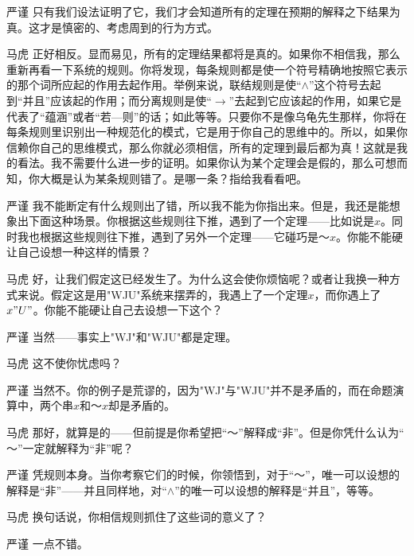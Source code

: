 \begin{dialogue}[labelwidth=2\ccwd, leftmargin=3\ccwd, topsep=\medskipamount]
\item[严谨]只有我们设法证明了它，我们才会知道所有的定理在预期的解释之下结果为真。这才是慎密的、考虑周到的行为方式。

\item[马虎]正好相反。显而易见，所有的定理结果都将是真的。如果你不相信我，那么重新再看一下系统的规则。你将发现，每条规则都是使一个符号精确地按照它表示的那个词所应起的作用去起作用。举例来说，联结规则是使“$∧$”这个符号去起到“并且”应该起的作用；而分离规则是使“$→$”去起到它应该起的作用，如果它是代表了“蕴涵”或者“若—则”的话；如此等等。只要你不是像乌龟先生那样，你将在每条规则里识别出一种规范化的模式，它是用于你自己的思维中的。所以，如果你信赖你自己的思维模式，那么你就必须相信，所有的定理到最后都为真！这就是我的看法。我不需要什么进一步的证明。如果你认为某个定理会是假的，那么可想而知，你大概是认为某条规则错了。是哪一条？指给我看看吧。

\item[严谨]我不能断定有什么规则出了错，所以我不能为你指出来。但是，我还是能想象出下面这种场景。你根据这些规则往下推，遇到了一个定理——比如说是$x$。同时我也根据这些规则往下推，遇到了另外一个定理——它碰巧是$～x$。你能不能硬让自己设想一种这样的情景？

\item[马虎]好，让我们假定这已经发生了。为什么这会使你烦恼呢？或者让我换一种方式来说。假定这是用"WJU"系统来摆弄的，我遇上了一个定理$x$，而你遇上了$x"U"$。你能不能硬让自己去设想一下这个？

\item[严谨]当然——事实上"WJ"和"WJU"都是定理。

\item[马虎]这不使你忧虑吗？

\item[严谨]当然不。你的例子是荒谬的，因为"WJ"与"WJU"并不是矛盾的，而在命题演算中，两个串$x$和$～x$却是矛盾的。

\item[马虎]那好，就算是的——但前提是你希望把“$～$”解释成“非”。但是你凭什么认为“$～$”一定就解释为“非”呢？

\item[严谨]凭规则本身。当你考察它们的时候，你领悟到，对于“$～$”，唯一可以设想的解释是“非”——并且同样地，对“$∧$”的唯一可以设想的解释是“并且”，等等。

\item[马虎]换句话说，你相信规则抓住了这些词的意义了？

\item[严谨]一点不错。


\end{dialogue}
